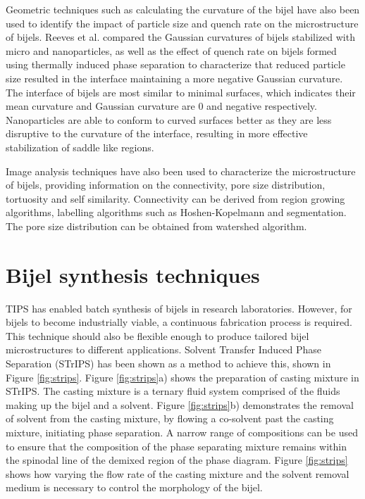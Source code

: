 Geometric techniques such as
calculating the curvature of the bijel have also been used to identify the impact of particle size and quench rate on the microstructure
of bijels. Reeves et al. compared the Gaussian curvatures of bijels stabilized with micro and nanoparticles, as well as the effect of quench rate
on bijels formed using thermally induced phase separation to characterize that reduced particle size resulted in the interface maintaining a more negative
Gaussian curvature. \cite{reeves_particle-size_2015,reeves_quantitative_2016}
The interface of bijels are most similar to minimal surfaces, which indicates their mean curvature and Gaussian curvature are 0 and negative respectively. 
\cite{jinnai_interfacial_2001} Nanoparticles are able to conform to curved surfaces better as they are less disruptive to the curvature of the interface, resulting
in more effective stabilization of saddle like regions. \cite{reeves_quantitative_2016} 

Image analysis techniques have also been used to characterize the microstructure of bijels, providing information on the connectivity, pore size
distribution, tortuosity and self similarity. \cite{mcdevitt_microstructural_2019,reeves_quantitative_2016} Connectivity can be derived from region
growing algorithms, labelling algorithms such as Hoshen-Kopelmann and segmentation. \cite{mcdevitt_microstructural_2019,reeves_quantitative_2016}
The pore size distribution can be obtained from watershed algorithm. \cite{mcdevitt_microstructural_2019}

\section{Bijel synthesis techniques}

TIPS has enabled batch synthesis of bijels in research laboratories. However, for bijels to become industrially viable, a continuous fabrication process is required.
This technique should also be flexible enough to produce tailored bijel microstructures to different applications. Solvent Transfer Induced Phase Separation (STrIPS) 
has been shown as a method to achieve this, shown in Figure \ref{fig:strips}. Figure \ref{fig:strips}a) shows the preparation of casting mixture in STrIPS. The casting
mixture is a ternary fluid system comprised of the fluids making up the bijel and a solvent. Figure \ref{fig:strips}b) demonstrates the removal of solvent from the
casting mixture, by flowing a co-solvent past the casting mixture, initiating phase separation. A narrow range of compositions can be used to ensure that the composition
of the phase separating mixture remains within the spinodal line of the demixed region of the phase diagram. Figure \ref{fig:strips} shows how varying the flow rate
of the casting mixture and the solvent removal medium is necessary to control the morphology of the bijel. 

